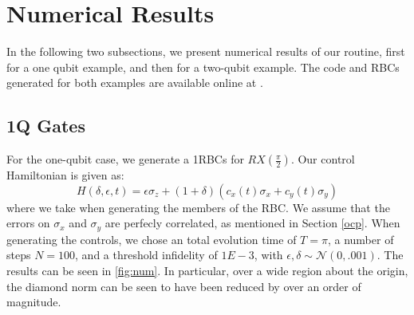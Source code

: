 \documentclass[aps,nofootinbib,pra,notitlepage,twocolumn]{revtex4-1}
\begin{document}

\section{Numerical Results}\label{numerical}
In the following two subsections, we present numerical results of our routine, first for a one qubit example, and then for a two-qubit example. The code and RBCs generated for both examples are available online at \cite{decorrelating_errors}.
\subsection{1Q Gates}\label{1Q Gates}
 For the one-qubit case, we generate a 1RBCs for $RX(\frac{\pi}{2})$. Our control Hamiltonian is given as:
\begin{equation}\label{eq:1Qham}
  H(\delta, \epsilon, t) = \epsilon\sigma_z + (1 + \delta)(c_x(t)\sigma_x + c_y(t)\sigma_y)
\end{equation}
where we take  when generating the members of the RBC. We assume that the errors on $\sigma_x$ and $\sigma_y$ are perfecly correlated, as mentioned in Section \ref{ocp}. When generating the controls, we chose an total evolution time of $T=\pi$, a number of steps $N=100$, and a threshold infidelity of $1E-3$, with $\epsilon, \delta \sim \mathcal{N}(0, .001)$. The results can be seen in \ref{fig:num}. In particular, over a wide region about the origin, the diamond norm can be seen to have been reduced by over an order of magnitude.
\end{document}
